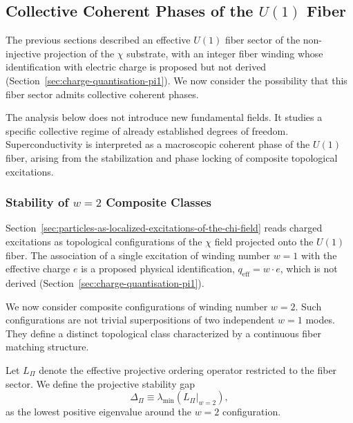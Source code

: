 \subsection{Collective Coherent Phases of the \texorpdfstring{$U(1)$}{U(1)} Fiber}
  \label{subsec:collective-U1-coherence}

  The previous sections described an effective $U(1)$ fiber sector of the non-injective projection
  of the $\chi$ substrate, with an integer fiber winding whose identification with electric charge
  is proposed but not derived (Section~\ref{sec:charge-quantisation-pi1}).
  We now consider the possibility that this fiber sector admits collective coherent phases.

  The analysis below does not introduce new fundamental fields.
  It studies a specific collective regime of already established degrees of freedom.
  Superconductivity is interpreted as a macroscopic coherent phase of the $U(1)$ fiber,
  arising from the stabilization and phase locking of composite topological excitations.

  \subsubsection*{Stability of \texorpdfstring{$w=2$}{w=2} Composite Classes}
    \label{subsubsec:w2-stability}

    Section~\ref{sec:particles-as-localized-excitations-of-the-chi-field} reads charged excitations as
    topological configurations of the $\chi$ field projected onto the $U(1)$ fiber.
    The association of a single excitation of winding number $w=1$ with the effective charge $e$ is a
    proposed physical identification, $q_{\mathrm{eff}} = w \cdot e$, which is not derived
    (Section~\ref{sec:charge-quantisation-pi1}).

    We now consider composite configurations of winding number $w=2$.
    Such configurations are not trivial superpositions of two independent $w=1$ modes.
    They define a distinct topological class characterized by a continuous fiber matching structure.

    Let $L_{\Pi}$ denote the effective projective ordering operator restricted to the fiber sector.
    We define the projective stability gap
    \begin{equation}
      \Delta_{\Pi} \equiv \lambda_{\min}\!\left(L_{\Pi}\big|_{w=2}\right),
    \end{equation}
    as the lowest positive eigenvalue around the $w=2$ configuration.

